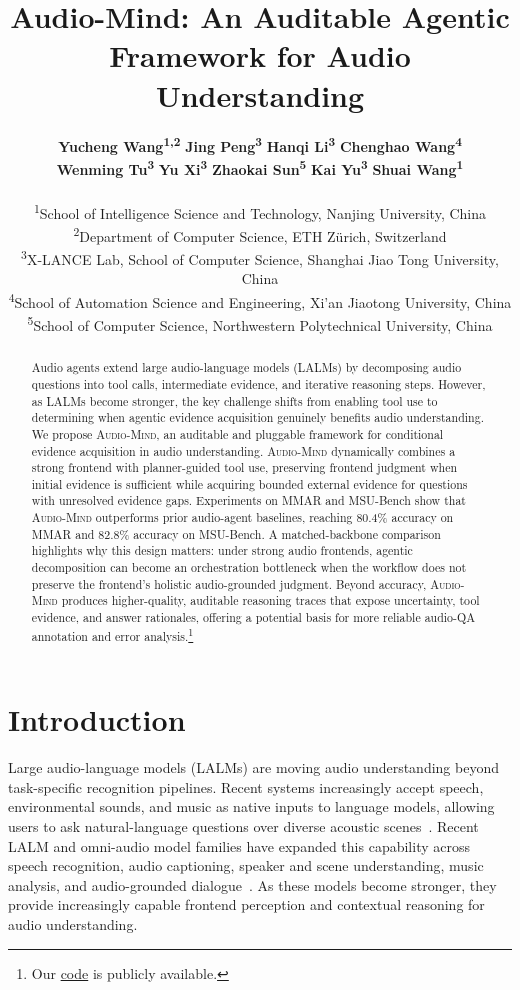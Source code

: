 \documentclass[11pt]{article}
\title{Audio-Mind: An Auditable Agentic Framework for Audio Understanding}
\author{
  \textbf{Yucheng Wang\textsuperscript{1,2\textdagger}} \quad
  \textbf{Jing Peng\textsuperscript{3\textdagger}} \quad
  \textbf{Hanqi Li\textsuperscript{3}} \quad
  \textbf{Chenghao Wang\textsuperscript{4}} \\
  \textbf{Wenming Tu\textsuperscript{3}} \quad
  \textbf{Yu Xi\textsuperscript{3}} \quad
  \textbf{Zhaokai Sun\textsuperscript{5}} \quad
  \textbf{Kai Yu\textsuperscript{3}} \quad
  \textbf{Shuai Wang\textsuperscript{1\textdaggerdbl}} \\
  \\[0.6ex]
  \normalfont\small
  \textsuperscript{1}School of Intelligence Science and Technology, Nanjing University, China \\
  \normalfont\small
  \textsuperscript{2}Department of Computer Science, ETH Zürich, Switzerland \\
  \normalfont\small
  \textsuperscript{3}X-LANCE Lab, School of Computer Science, Shanghai Jiao Tong University, China \\
  \normalfont\small
  \textsuperscript{4}School of Automation Science and Engineering, Xi'an Jiaotong University, China \\
  \normalfont\small
  \textsuperscript{5}School of Computer Science, Northwestern Polytechnical University, China
}
\newcommand{\ours}{\textsc{Audio-Mind}}
\begin{document}
\maketitle
\begingroup
\renewcommand{\thefootnote}{\textdagger}
\renewcommand{\thefootnote}{\textdaggerdbl}

\endgroup
\begin{abstract}
Audio agents extend large audio-language models (LALMs) by decomposing audio questions into tool calls, intermediate evidence, and iterative reasoning steps. However, as LALMs become stronger, the key challenge shifts from enabling tool use to determining when agentic evidence acquisition genuinely benefits audio understanding. We propose \ours{}, an auditable and pluggable framework for conditional evidence acquisition in audio understanding. \ours{} dynamically combines a strong frontend with planner-guided tool use, preserving frontend judgment when initial evidence is sufficient while acquiring bounded external evidence for questions with unresolved evidence gaps. Experiments on MMAR and MSU-Bench show that \ours{} outperforms prior audio-agent baselines, reaching 80.4\% accuracy on MMAR and 82.8\% accuracy on MSU-Bench. A matched-backbone comparison highlights why this design matters: under strong audio frontends, agentic decomposition can become an orchestration bottleneck when the workflow does not preserve the frontend’s holistic audio-grounded judgment. Beyond accuracy, \ours{} produces higher-quality, auditable reasoning traces that expose uncertainty, tool evidence, and answer rationales, offering a potential basis for more reliable audio-QA annotation and error analysis.\footnote{Our \href{https://github.com/DELTA-DoubleWise/Audio-Mind}{code} is publicly available.}
\end{abstract}

\section{Introduction}

Large audio-language models (LALMs) are moving audio understanding beyond task-specific recognition pipelines. Recent systems increasingly accept speech, environmental sounds, and music as native inputs to language models, allowing users to ask natural-language questions over diverse acoustic scenes~\citep{peng2024survey_speech_llms_understanding,cui2024recent_speechlm_survey}. Recent LALM and omni-audio model families have expanded this capability across speech recognition, audio captioning, speaker and scene understanding, music analysis, and audio-grounded dialogue~\citep{chu2024qwen2audio,ding2025kimi,zhang2025mimo,huang2025step,xu2025qwen3,qwen2026qwen35omni}. As these models become stronger, they provide increasingly capable frontend perception and contextual reasoning for audio understanding.
\end{document}
